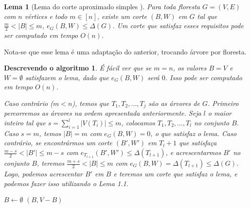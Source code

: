\documentclass[a4paper,12pt]{article}
\newtheorem{lem}{Lema}
\newtheorem{alg}{Descrevendo o algoritmo}
\begin{document}
\bigskip
\bigskip
\bigskip
\bigskip

\begin{lem}[Lema do corte aproximado simples \cite{Schmidt15, Lemma 3}]

	Para toda floresta $G=(V,E)$ com $n$ vértices e todo $m \in [n]$,
	existe um corte $(B,W)$ em $G$ tal que 
	$\frac{m}{2} <|B| \le m$,
	$e_G(B,W) \le \Delta(G)$.
	Um corte que satisfaz esses requisitos pode ser computado em
	tempo $O(n)$.
\end{lem}

\medskip

Nota-se que esse lema é uma adaptação do anterior, trocando árvore
por floresta.

\medskip

\begin{alg}
	É fácil ver que se $m=n$, os valores $B = V$ e $W = \emptyset$ 
	satisfazem o lema, dado que $e_G(B,W)$ será $0$. Isso pode ser 
	computado em tempo $O(n)$.

	Caso contrário ($m<n$), temos que $T_1, T_2, \ldots,T_j $ são 
	as árvores de $G$. 
	Primeiro percorremos as árvores na ordem apresentada 
	anteriormente. Seja $l$ o maior inteiro tal que 
	$s = \displaystyle\sum_{i=1}^{l}|V(T_i)| \le m$,
	colocamos $T_1,T_2, \ldots,T_l$ no conjunto $B$.
	Caso $s=m$, temos $|B|=m$ com  $e_G(B,W)=0$, o que satisfaz o lema.
	Caso contrário, se encontrármos um corte $(B',W')$ em $T_l+1$ que
	satisfaça $\frac{m-s}{2}<|B'|\le m-s$ com $e_{T_{l+1}}(B',W') \le 
	\Delta(T_{l+1})$, e acrescentarmos $B'$ no conjunto
	$B$, teremos
	$\frac{m+s}{2}<|B| \le m$ com 
	$e_G(B,W) = \Delta(T_{l+1}) \le \Delta(G)$.
	Logo, podemos acrescentar $B'$ em $B$ e teremos um corte
	que satisfaz o lema, e podemos fazer isso utilizando o Lema 1.1.

\end{alg}

\begin{algorithm}[H]

	\caption{Computa corte aproximado simples}
	$B \gets \emptyset$\;
	{
	}
	\Return $(B,V-B)$\;

\end{algorithm}	
\end{document}
